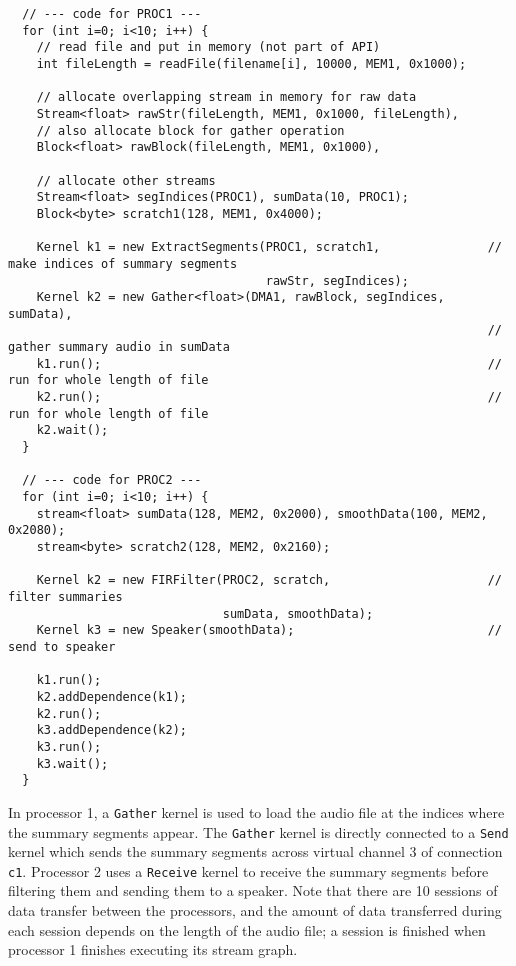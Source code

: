 {\small
\begin{verbatim}
  // --- code for PROC1 ---
  for (int i=0; i<10; i++) {
    // read file and put in memory (not part of API)
    int fileLength = readFile(filename[i], 10000, MEM1, 0x1000);

    // allocate overlapping stream in memory for raw data
    Stream<float> rawStr(fileLength, MEM1, 0x1000, fileLength), 
    // also allocate block for gather operation
    Block<float> rawBlock(fileLength, MEM1, 0x1000), 
    
    // allocate other streams
    Stream<float> segIndices(PROC1), sumData(10, PROC1);
    Block<byte> scratch1(128, MEM1, 0x4000);

    Kernel k1 = new ExtractSegments(PROC1, scratch1,               // make indices of summary segments
                                    rawStr, segIndices);
    Kernel k2 = new Gather<float>(DMA1, rawBlock, segIndices, sumData),  
                                                                   // gather summary audio in sumData
    k1.run();                                                      // run for whole length of file
    k2.run();                                                      // run for whole length of file
    k2.wait();
  }

  // --- code for PROC2 ---
  for (int i=0; i<10; i++) {
    stream<float> sumData(128, MEM2, 0x2000), smoothData(100, MEM2, 0x2080);
    stream<byte> scratch2(128, MEM2, 0x2160);

    Kernel k2 = new FIRFilter(PROC2, scratch,                      // filter summaries
                              sumData, smoothData);
    Kernel k3 = new Speaker(smoothData);                           // send to speaker

    k1.run();
    k2.addDependence(k1);
    k2.run();
    k3.addDependence(k2);
    k3.run();
    k3.wait();
  }   
\end{verbatim}}

In processor 1, a {\tt Gather} kernel is used to load the audio file
at the indices where the summary segments appear.  The {\tt Gather}
kernel is directly connected to a {\tt Send} kernel which sends the
summary segments across virtual channel 3 of connection {\tt c1}.
Processor 2 uses a {\tt Receive} kernel to receive the summary
segments before filtering them and sending them to a speaker.  Note
that there are 10 sessions of data transfer between the processors,
and the amount of data transferred during each session depends on the
length of the audio file; a session is finished when processor 1
finishes executing its stream graph.
